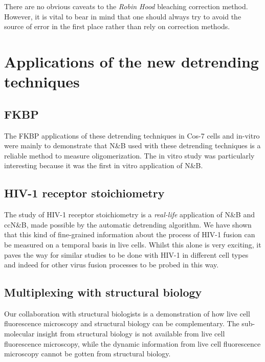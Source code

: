 \documentclass[12pt,]{book}
\theoremstyle{definition}
\theoremstyle{definition}
\theoremstyle{definition}
\theoremstyle{remark}
\begin{document}
There are no obvious caveats to the \emph{Robin Hood} bleaching
correction method. However, it is vital to bear in mind that one should
always try to avoid the source of error in the first place rather than
rely on correction methods.

\section{Applications of the new detrending
techniques}\label{applications-of-the-new-detrending-techniques}

\subsection{FKBP}\label{fkbp}

The FKBP applications of these detrending techniques in Cos-7 cells
\citep{nandb} and in-vitro were mainly to demonstrate that N\&B used
with these detrending techniques is a reliable method to measure
oligomerization. The in vitro study \citep{JOVE} was particularly
interesting because it was the first in vitro application of N\&B.

\subsection{HIV-1 receptor
stoichiometry}\label{hiv-1-receptor-stoichiometry-1}

The study of HIV-1 receptor stoichiometry \citep{HIVstoichiometry} is a
\emph{real-life} application of N\&B and ccN\&B, made possible by the
automatic detrending algorithm. We have shown that this kind of
fine-grained information about the process of HIV-1 fusion can be
measured on a temporal basis in live cells. Whilst this alone is very
exciting, it paves the way for similar studies to be done with HIV-1 in
different cell types and indeed for other virus fusion processes to be
probed in this way.

\subsection{Multiplexing with structural
biology}\label{multiplexing-with-structural-biology}

Our collaboration with structural biologists \citep{HIVstoichiometry} is
a demonstration of how live cell fluorescence microscopy and structural
biology can be complementary. The sub-molecular insight from structural
biology is not available from live cell fluorescence microscopy, while
the dynamic information from live cell fluorescence microscopy cannot be
gotten from structural biology.
\end{document}
